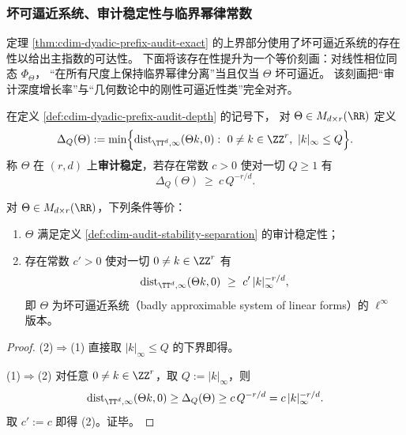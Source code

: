 \subsubsection{坏可逼近系统、审计稳定性与临界幂律常数}\label{subsubsec:cdim-badly-approximable-audit-stability}
定理 \ref{thm:cdim-dyadic-prefix-audit-exact} 的上界部分使用了坏可逼近系统的存在性以给出主指数的可达性。
下面将该存在性提升为一个等价刻画：对线性相位同态 \(\Phi_\Theta\)，
“在所有尺度上保持临界幂律分离”当且仅当 \(\Theta\) 坏可逼近。
该刻画把“审计深度增长率”与“几何数论中的刚性可逼近性类”完全对齐。

\begin{definition}[审计稳定性的分离度下界]\label{def:cdim-audit-stability-separation}
在定义 \ref{def:cdim-dyadic-prefix-audit-depth} 的记号下，
对 \(\Theta\in M_{d\times r}(\RR)\) 定义
\[
\Delta_Q(\Theta):=\min\Bigl\{\operatorname{dist}_{\TT^d,\infty}(\Theta k,0):\ 0\neq k\in\ZZ^r,\ |k|_\infty\le Q\Bigr\}.
\]
称 \(\Theta\) 在 \((r,d)\) 上\textbf{审计稳定}，若存在常数 \(c>0\) 使对一切 \(Q\ge 1\) 有
\[
\Delta_Q(\Theta)\ \ge\ c\,Q^{-r/d}.
\]
\end{definition}

\begin{proposition}[审计稳定性等价于坏可逼近]\label{prop:cdim-audit-stability-iff-badly-approximable}
对 \(\Theta\in M_{d\times r}(\RR)\)，下列条件等价：
\begin{enumerate}
  \item \(\Theta\) 满足定义 \ref{def:cdim-audit-stability-separation} 的审计稳定性；
  \item 存在常数 \(c'>0\) 使对一切 \(0\neq k\in\ZZ^r\) 有
  \[
  \operatorname{dist}_{\TT^d,\infty}(\Theta k,0)\ \ge\ c'\,|k|_\infty^{-r/d},
  \]
  即 \(\Theta\) 为坏可逼近系统（badly approximable system of linear forms）的 \(\ell^\infty\) 版本。
\end{enumerate}
\end{proposition}
\begin{proof}
(2)\(\Rightarrow\)(1) 直接取 \(|k|_\infty\le Q\) 的下界即得。
\par
(1)\(\Rightarrow\)(2) 对任意 \(0\neq k\in\ZZ^r\)，取 \(Q:=|k|_\infty\)，则
\[
\operatorname{dist}_{\TT^d,\infty}(\Theta k,0)
\ge \Delta_Q(\Theta)
\ge c\,Q^{-r/d}
=c\,|k|_\infty^{-r/d}.
\]
取 \(c':=c\) 即得 (2)。证毕。
\end{proof}

